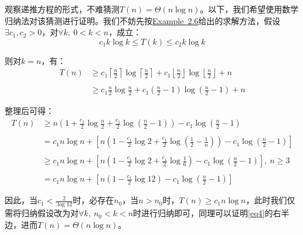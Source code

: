 \documentclass[12pt,a4paper,violet]{bbe}
\begin{document}
\begin{solution}[\textbf{（方法1）}]
	观察递推方程的形式，不难猜测$T(n)=\Theta(n\log n)$。以下，我们希望使用数学归纳法对该猜测进行证明。我们不妨先按\hyperref[ex2.6]{Example~2.6}给出的求解方法，假设$\exists c_1,c_2>0$，对$\forall k,~0<k<n$，成立：
	\begin{equation}
	c_1k\log k\leqslant T(k)\leqslant c_2k\log k
	\label{eq4}
	\end{equation}
	
	则对$k=n$，有：
	$$
	\begin{array}{rl}
	T(n)&\geqslant c_1\left\lceil\frac{n}{2}\right\rceil\log\left\lceil\frac{n}{2}\right\rceil+c_1\left\lfloor\frac{n}{2}\right\rfloor\log\left\lfloor\frac{n}{2}\right\rfloor+n\\
	&\\
	&\geqslant c_1\frac{n}{2}\log\frac{n}{2}+c_1(\frac{n}{2}-1)\log(\frac{n}{2}-1)+n
\end{array}
$$

整理后可得：
$$
\begin{array}{rl}
T(n)&\geqslant n(1+\frac{c_1}{2}\log \frac{n}{2}+\frac{c_1}{2}\log(\frac{n}{2}-1))-c_1\log(\frac{n}{2}-1)\\
&\\
&=c_1n\log n+\left[n(1-\frac{c_1}{2}\log 2+\frac{c_1}{2}\log(\frac{1}{2}-\frac{1}{n}))-c_1\log(\frac{n}{2}-1)\right]\\

&\\
&\geqslant c_1n\log n+\left[n(1-\frac{c_1}{2}\log 2+\frac{c_1}{2}\log\frac{1}{6})-c_1\log(\frac{n}{2}-1)\right],~n\geqslant 3\\
& \\
&=c_1n\log n+\left[n(1-\frac{c_1}{2}\log 12)-c_1\log(\frac{n}{2}-1)\right]
\end{array}
$$

因此，当$c_1<\frac{2}{\log 12}$时，必存在$n_0$，当$n>n_0$时，$T(n)\geqslant c_1n\log n$，此时我们仅需将归纳假设改为对$\forall k,~n_0<k<n$时进行归纳即可，同理可以证明\cref{eq4}的右半边，进而$T(n)=\Theta(n\log n)$。
\end{solution}
\end{document}
